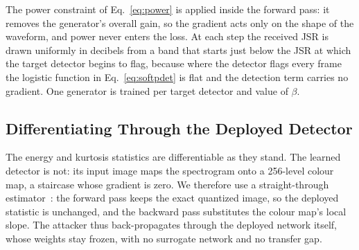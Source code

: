 The power constraint of Eq.~\eqref{eq:power} is applied inside the forward pass: it removes the generator's overall gain, so the gradient acts only on the shape of the waveform, and power never enters the loss.
At each step the received JSR is drawn uniformly in decibels from a band that starts just below the JSR at which the target detector begins to flag, because where the detector flags every frame the logistic function in Eq.~\eqref{eq:softpdet} is flat and the detection term carries no gradient.
One generator is trained per target detector and value of $\beta$.

\subsection{Differentiating Through the Deployed Detector}
\label{sec:method:ste}
The energy and kurtosis statistics are differentiable as they stand.
The learned detector is not: its input image maps the spectrogram onto a 256-level colour map, a staircase whose gradient is zero.
We therefore use a straight-through estimator~\cite{bengio2013estimating}: the forward pass keeps the exact quantized image, so the deployed statistic is unchanged, and the backward pass substitutes the colour map's local slope.
The attacker thus back-propagates through the deployed network itself, whose weights stay frozen, with no surrogate network and no transfer gap.


